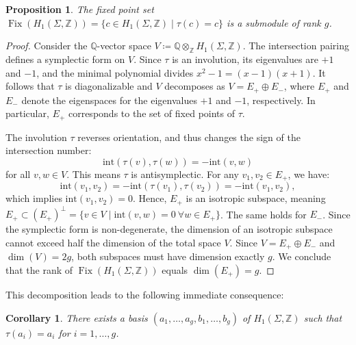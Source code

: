 \documentclass[11pt,a4paper]{article}
\newtheorem{proposition}[theorem]{Proposition}
\newtheorem{corollary}[theorem]{Corollary}
\theoremstyle{definition}
\newcommand{\Z}{\mathds{Z}}
\newcommand{\Q}{\mathds{Q}}
\DeclareMathOperator{\fix}{\mathrm{Fix}}
\begin{document}
\begin{proposition}\label{prop:fixedpointhomology}
	The fixed point set $\fix(H_1(\Sigma,\Z)) = \{ c \in H_1(\Sigma,\Z) \mid \tau(c) = c \}$ is a submodule of rank $g$.
\end{proposition}

\begin{proof}
	Consider the $\Q$-vector space $V \coloneq \Q \otimes_{\Z} H_1(\Sigma,\Z)$. The intersection pairing defines a symplectic form on $V$. Since $\tau$ is an involution, its eigenvalues are $+1$ and $-1$, and the minimal polynomial divides $x^2 - 1 = (x-1)(x+1)$. It follows that $\tau$ is diagonalizable and $V$ decomposes as $V = E_+ \oplus E_-$, where $E_+$ and $E_-$ denote the eigenspaces for the eigenvalues $+1$ and $-1$, respectively. In particular, $E_+$ corresponds to the set of fixed points of $\tau$.
	
	The involution $\tau$ reverses orientation, and thus changes the sign of the intersection number:
	\[
	\mathrm{int}(\tau(v), \tau(w)) = - \mathrm{int}(v,w)
	\]
	for all $v, w \in V$. This means $\tau$ is antisymplectic. For any $v_1, v_2 \in E_+$, we have:
	\[
	\mathrm{int}(v_1,v_2) = - \mathrm{int}(\tau(v_1),\tau(v_2)) = - \mathrm{int}(v_1,v_2),
	\]
	which implies $\mathrm{int}(v_1,v_2) = 0$. Hence, $E_+$ is an isotropic subspace, meaning $E_+ \subset (E_+)^\perp = \{ v \in V \mid \mathrm{int}(v,w) = 0 \ \forall w \in E_+ \}$. The same holds for $E_-$. Since the symplectic form is non-degenerate, the dimension of an isotropic subspace cannot exceed half the dimension of the total space $V$. Since $V = E_+ \oplus E_-$ and $\dim(V) = 2g$, both subspaces must have dimension exactly $g$. We conclude that the rank of $\fix(H_1(\Sigma,\Z))$ equals $\dim(E_+) = g$.
\end{proof}

This decomposition leads to the following immediate consequence:

\begin{corollary}\label{cor:homologybasis1}
	There exists a basis $(a_1, \ldots, a_g, b_1, \ldots, b_g)$ of $H_1(\Sigma,\Z)$ such that $\tau(a_i) = a_i$ for $i = 1, \ldots, g$.
\end{corollary}
\end{document}
